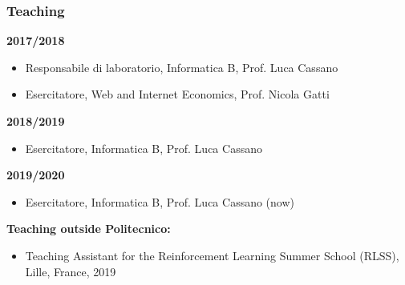\documentclass[aspectratio=169]{beamer}
\begin{document}
\begin{frame}
\frametitle{Teaching}
\textbf{2017/2018}
\begin{itemize}
	\setlength{\itemsep}{10pt}
	\item  Responsabile di laboratorio, Informatica B, Prof. Luca Cassano
	\item  Esercitatore, Web and Internet Economics, Prof. Nicola Gatti
\end{itemize}

\vfill
\textbf{2018/2019}
\begin{itemize}
	\setlength{\itemsep}{10pt}
	\item  Esercitatore, Informatica B, Prof. Luca Cassano
\end{itemize}

\vfill
\textbf{2019/2020}
\begin{itemize}
	\setlength{\itemsep}{10pt}
	\item  Esercitatore, Informatica B, Prof. Luca Cassano (now)
\end{itemize}

\vfill
\textbf{Teaching outside Politecnico:}
\begin{itemize}
	\setlength{\itemsep}{10pt}
	\item Teaching Assistant for the Reinforcement Learning Summer School (RLSS), Lille, France, 2019
\end{itemize}
\end{frame}
\end{document}
